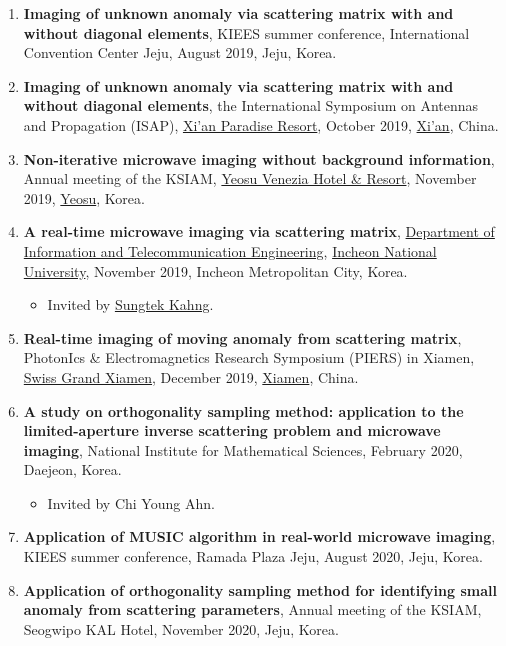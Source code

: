 \documentclass[10pt,A4]{article}
\begin{document}
\begin{enumerate}
\item\label{P-KIEES2019B} \textbf{Imaging of unknown anomaly via scattering matrix with and without diagonal elements}, KIEES summer conference, International Convention Center Jeju, August 2019, Jeju, Korea.
\item\label{P-ISAP2019} \textbf{Imaging of unknown anomaly via scattering matrix with and without diagonal elements}, the  International Symposium on Antennas and Propagation (ISAP), \href{http://www.paradiseresortxian.com/}{Xi'an Paradise Resort}, October 2019, \href{http://www.xa.gov.cn/}{Xi'an}, China.
\item\label{P-KSIAM2019} \textbf{Non-iterative microwave imaging without background information}, Annual meeting of the KSIAM, \href{http://www.yeosuvenezia.com}{Yeosu Venezia Hotel \& Resort}, November 2019, \href{http://www.yeosu.go.kr}{Yeosu}, Korea.
\item\label{P-INU2019} \textbf{A real-time microwave imaging via scattering matrix}, \href{http://ite.inu.ac.kr/user/indexMain.do?siteId=ite_eng}{Department of Information and Telecommunication Engineering}, \href{http://www.inu.ac.kr/mbshome/mbs/inuengl/index.html}{Incheon National University}, November 2019, Incheon Metropolitan City, Korea.
\begin{itemize}
\item Invited by \href{https://sites.google.com/site/miemiincheonnationaluniversity/}{Sungtek Kahng}.
\end{itemize}
\item\label{P-PIERS2019C} \textbf{Real-time imaging of moving anomaly from scattering matrix}, PhotonIcs \& Electromagnetics Research Symposium (PIERS) in Xiamen, \href{http://www.swissgrandxiamen.com.cn/en}{Swiss Grand Xiamen}, December 2019, \href{http://english.xm.gov.cn}{Xiamen}, China.
\item\label{P-NIMS2020} \textbf{A study on orthogonality sampling method: application to the limited-aperture inverse scattering problem and microwave imaging}, National Institute for Mathematical Sciences, February 2020, Daejeon, Korea.
    \begin{itemize}
\item Invited by Chi Young Ahn.
\end{itemize}
\item\label{P-KIEES2020A} \textbf{Application of MUSIC algorithm in real-world microwave imaging}, KIEES summer conference, Ramada Plaza Jeju, August 2020, Jeju, Korea.
\item\label{P-KSIAM2020} \textbf{Application of orthogonality sampling method for identifying small anomaly from scattering parameters}, Annual meeting of the KSIAM, Seogwipo KAL Hotel, November 2020, Jeju, Korea.

\end{enumerate}
\end{document}
